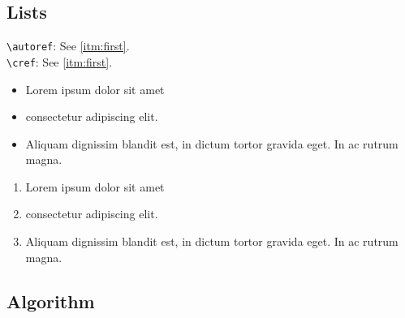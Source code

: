 \documentclass[onecolumn]{article}
\theoremstyle{definition}
\theoremstyle{remark}
\begin{document}
\begin{table}
    \centering
    \caption{Sample table title}
\end{table}

\lipsum[8-9]

\subsection{Lists}

\verb+\autoref+: See \autoref{itm:first}. \\
\verb+\cref+: See \cref{itm:first}.

\begin{itemize}
    \item Lorem ipsum dolor sit amet
    \item consectetur adipiscing elit.
    \item Aliquam dignissim blandit est, in dictum tortor gravida eget. In ac rutrum magna.
\end{itemize}

\begin{enumerate}[label=\Roman*.]
    \item \label{itm:first} Lorem ipsum dolor sit amet
    \item consectetur adipiscing elit.
    \item Aliquam dignissim blandit est, in dictum tortor gravida eget. In ac rutrum magna.
\end{enumerate}

\subsection{Algorithm}
\end{document}

